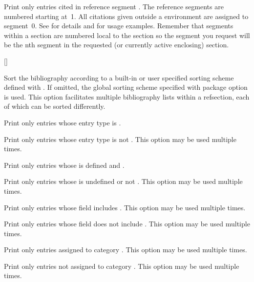\documentclass{ltxdockit}[2011/03/25]
\begin{document}
\begin{optionlist*}

Print only entries cited in reference segment . The reference segments are numbered starting at~1. All citations given outside a  environment are assigned to segment~0. See  for details and  for usage examples. Remember that segments within a section are numbered local to the section so the segment you request will be the nth segment in the requested (or currently active enclosing) section.

[\BiberOnly]

Sort the bibliography according to a built-in or user specified sorting scheme defined with . If omitted, the global sorting scheme specified with package  option is used. This option facilitates multiple bibliography lists within a refsection, each of which can be sorted differently.


Print only entries whose entry type is .


Print only entries whose entry type is not . This option may be used multiple times.


Print only entries whose  is defined and .


Print only entries whose  is undefined or not . This option may be used multiple times.


Print only entries whose  field includes . This option may be used multiple times.


Print only entries whose  field does not include . This option may be used multiple times.


Print only entries assigned to category . This option may be used multiple times.


Print only entries not assigned to category . This option may be used multiple times.


\end{optionlist*}
\end{document}

